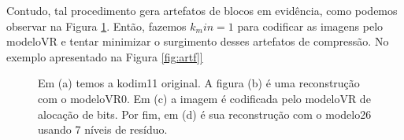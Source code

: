 Contudo, tal procedimento gera artefatos de blocos em evidência, como podemos observar na Figura \ref{fig:artf}. Então, fazemos $k_min=1$ para codificar as imagens pelo modeloVR e tentar minimizar o surgimento desses artefatos de compressão.   
No exemplo apresentado na Figura \ref{fig:artf]}

\begin{figure}
	
	\hfill
	
	\hfill
	\label{fig:artf}
	\caption[Surgimento de artefatos de blocos em modelos baseados em alocação de bits.]{Em (a) temos a kodim11 original. A figura (b) é uma reconstrução com o modeloVR0. Em (c) a imagem é codificada pelo modeloVR de alocação de bits. Por fim, em (d) é sua reconstrução com o modelo26 usando 7 níveis de resíduo.}
	
\end{figure}

